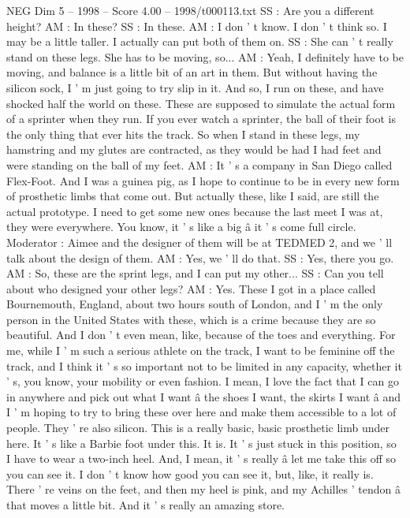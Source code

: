 \begin{textsample}{NEG Dim 5 – 1998 – Score 4.00 – 1998/t000113.txt}
SS : Are you a different height?
AM : In these?
SS : In these.
AM : I don ' t know.
I don ' t think so.
I may be a little taller.
I actually can put both of them on.
SS : She can ' t really stand on these legs.
She has to be moving, so...
AM : Yeah, I definitely have to be moving, and balance is a little bit of an art in them.
But without having the silicon sock, I ' m just going to try slip in it.
And so, I run on these, and have shocked half the world on these.
These are supposed to simulate the actual form of a sprinter when they run.
If you ever watch a sprinter, the ball of their foot is the only thing that ever hits the track.
So when I stand in these legs, my hamstring and my glutes are contracted, as they would be had I had feet and were standing on the ball of my feet.
AM : It ' s a company in San Diego called Flex-Foot.
And I was a guinea pig, as I hope to continue to be in every new form of prosthetic limbs that come out.
But actually these, like I said, are still the actual prototype.
I need to get some new ones because the last meet I was at, they were everywhere.
You know, it ' s like a big â it ' s come full circle.
Moderator : Aimee and the designer of them will be at TEDMED 2, and we ' ll talk about the design of them.
AM : Yes, we ' ll do that.
SS : Yes, there you go.
AM : So, these are the sprint legs, and I can put my other...
SS : Can you tell about who designed your other legs?
AM : Yes.
These I got in a place called Bournemouth, England, about two hours south of London, and I ' m the only person in the United States with these, which is a crime because they are so beautiful.
And I don ' t even mean, like, because of the toes and everything.
For me, while I ' m such a serious athlete on the track, I want to be feminine off the track, and I think it ' s so important not to be limited in any capacity, whether it ' s, you know, your mobility or even fashion.
I mean, I love the fact that I can go in anywhere and pick out what I want â the shoes I want, the skirts I want â and I ' m hoping to try to bring these over here and make them accessible to a lot of people.
They ' re also silicon.
This is a really basic, basic prosthetic limb under here.
It ' s like a Barbie foot under this.
It is.
It ' s just stuck in this position, so I have to wear a two-inch heel.
And, I mean, it ' s really â let me take this off so you can see it.
I don ' t know how good you can see it, but, like, it really is.
There ' re veins on the feet, and then my heel is pink, and my Achilles ' tendon â that moves a little bit.
And it ' s really an amazing store.

\end{textsample}

